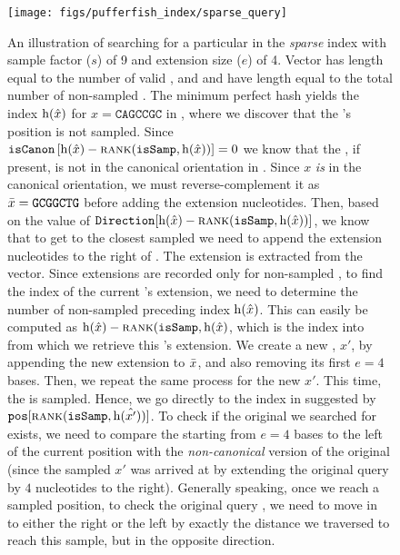   \begin{figure}
    \texttt{[image: figs/pufferfish\_index/sparse\_query]}
    \caption{{\small An illustration of searching for a particular \kmer in the \emph{sparse}
    \system index with sample factor ($s$) of 9 and extension size ($e$) of 4.
    Vector \sampvec has length equal to the number of valid \kmers, and \canonvec
    and \extvec have length equal to the total number of non-sampled \kmers. The
    minimum perfect hash yields the index $\operatorname{h}(\hat{x})$ for
    $x=\texttt{CAGCCGC}$ in \sampvec, where we discover that the \kmer's position
    is not sampled. Since $\texttt{isCanon}
    \left[\operatorname{h}(\hat{x}) - \mbox{\sc rank}(\texttt{isSamp},\operatorname{h}(\hat{x}))\right] = 0$ we know that the \kmer,
    if present, is not in the canonical orientation in \cseq. Since $x$ \emph{is}
    in the canonical orientation, we must reverse-complement it as
    $\bar{x}=\texttt{GCGGCTG}$ before adding the extension nucleotides. Then, based
    on the value of $\texttt{Direction}[\operatorname{h}(\hat{x}) - \mbox{\sc rank}(\texttt{isSamp},\operatorname{h}(\hat{x}))]$, we know that to get to the closest sampled \kmer we need to append the extension nucleotides to the right of . The
    extension is extracted from the \qextvec vector.  Since extensions are recorded only
    for non-sampled \kmers, to find the index of the current \kmer's extension,
    we need to determine the number of non-sampled \kmers preceding index $\operatorname{h}(\hat{x})$.
    This can easily be computed as $\operatorname{h}(\hat{x}) - \mbox{\sc rank}(\texttt{isSamp},\operatorname{h}(\hat{x})$, which
    is the index into \qextvec from which we retrieve this \kmers's extension. We
    create a new \kmer, $x'$, by appending the new extension to $\bar{x}$, and also
    removing its first $e=4$ bases. Then, we repeat the same process for the new
    \kmer $x'$. This time, the \kmer is sampled. Hence, we go directly to the index in
    \cseq suggested by $\texttt{pos}[\mbox{\sc rank}(\texttt{isSamp},\operatorname{h}(\hat{x'}))]$. To check if the
    original \kmer we searched for exists, we need to compare the \kmer starting
    from $e=4$ bases to the left of the current position with the \emph{non-canonical}
    version of the original \kmer (since the sampled \kmer $x'$ was arrived at by
    extending the original query \kmer by $4$ nucleotides to the right). Generally speaking,
    once we reach a sampled position, to check the original query \kmer, we need
    to move in \cseq to either the right or the left by exactly the distance we
    traversed to reach this sample, but in the opposite direction.}}
    \label{fig:sparse_query}
  \end{figure}


